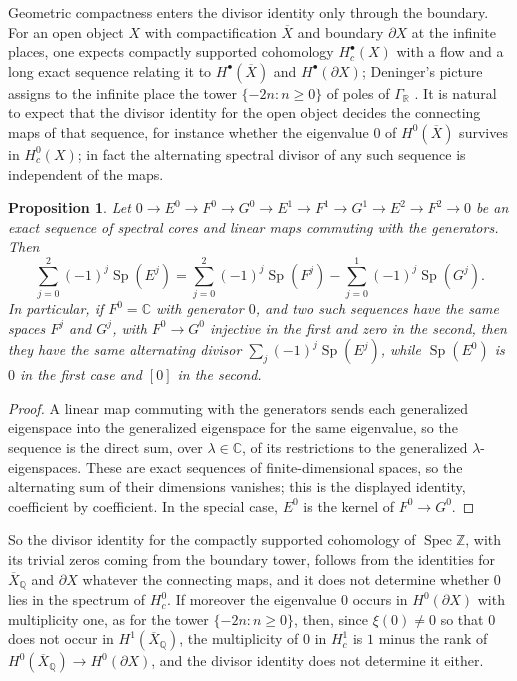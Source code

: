\documentclass[11pt]{amsart}
\theoremstyle{plain}
\newtheorem{proposition}[theorem]{Proposition}
\theoremstyle{definition}
\theoremstyle{remark}
\numberwithin{equation}{section}
\newcommand{\C}{\mathbb{C}}
\newcommand{\Q}{\mathbb{Q}}
\newcommand{\Z}{\mathbb{Z}}
\newcommand{\Xbar}{\overline{X}}
\newcommand{\GR}{\Gamma_{\mathbb{R}}}
\DeclareMathOperator{\Spec}{Spec}
\begin{document}
Geometric compactness enters the divisor identity only through the
boundary. For an open object $X$ with compactification $\Xbar$ and
boundary $\partial X$ at the infinite places, one expects compactly
supported cohomology $H_c^\bullet(X)$ with a flow and a long exact
sequence relating it to $H^\bullet(\Xbar)$ and $H^\bullet(\partial X)$;
Deninger's picture assigns to the infinite place the tower
$\{-2n:n\ge0\}$ of poles of $\GR$
\cite[pp.~167--168]{Deninger1998Analogies}.
It is natural to expect that the divisor identity for the open object
decides the connecting maps of that sequence, for instance whether the
eigenvalue $0$ of $H^0(\Xbar)$ survives in $H^0_c(X)$; in fact the
alternating spectral divisor of any such sequence is independent of the
maps.

\begin{proposition}\label{prop:kun-open}
Let $0\to E^0\to F^0\to G^0\to E^1\to F^1\to G^1\to E^2\to F^2\to0$ be
an exact sequence of spectral cores and linear maps commuting with the
generators. Then
\[
\sum_{j=0}^2(-1)^j\operatorname{Sp}(E^j)=\sum_{j=0}^2(-1)^j
\operatorname{Sp}(F^j)-\sum_{j=0}^1(-1)^j\operatorname{Sp}(G^j).
\]
In particular, if $F^0=\C$ with generator $0$, and two such sequences
have the same spaces $F^j$ and $G^j$, with $F^0\to G^0$ injective in the
first and zero in the second, then they have the same alternating
divisor $\sum_j(-1)^j\operatorname{Sp}(E^j)$, while
$\operatorname{Sp}(E^0)$ is $0$ in the first case and $[0]$ in the
second.
\end{proposition}

\begin{proof}
A linear map commuting with the generators sends each generalized
eigenspace into the generalized eigenspace for the same eigenvalue, so
the sequence is the direct sum, over $\lambda\in\C$, of its restrictions
to the generalized $\lambda$-eigenspaces. These are exact sequences of
finite-dimensional spaces, so the alternating sum of their dimensions
vanishes; this is the displayed identity, coefficient by coefficient.
In the special case, $E^0$ is the kernel of $F^0\to G^0$.
\end{proof}

So the divisor identity for the compactly supported cohomology of
$\Spec\Z$, with its trivial zeros coming from the boundary tower,
follows from the identities for $\Xbar_\Q$ and $\partial X$ whatever the
connecting maps, and it does not determine whether $0$ lies in the
spectrum of $H^0_c$. If moreover the eigenvalue $0$ occurs in
$H^0(\partial X)$ with multiplicity one, as for the tower $\{-2n:n\ge0\}$,
then, since $\xi(0)\ne0$ so that $0$ does not occur in
$H^1(\Xbar_\Q)$, the multiplicity of $0$ in $H^1_c$ is $1$ minus the
rank of $H^0(\Xbar_\Q)\to H^0(\partial X)$, and the divisor identity
does not determine it either.
\end{document}
